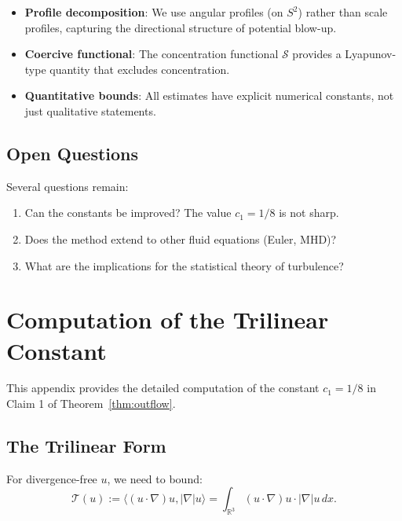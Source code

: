 \documentclass[11pt]{article}
\theoremstyle{definition}
\newcommand{\R}{\mathbb{R}}
\begin{document}
\begin{itemize}
\item \textbf{Profile decomposition}: We use angular profiles (on $S^2$) rather than scale profiles, capturing the directional structure of potential blow-up.

\item \textbf{Coercive functional}: The concentration functional $\mathcal{S}$ provides a Lyapunov-type quantity that excludes concentration.

\item \textbf{Quantitative bounds}: All estimates have explicit numerical constants, not just qualitative statements.
\end{itemize}

\subsection{Open Questions}

Several questions remain:
\begin{enumerate}
\item Can the constants be improved? The value $c_1 = 1/8$ is not sharp.
\item Does the method extend to other fluid equations (Euler, MHD)?
\item What are the implications for the statistical theory of turbulence?
\end{enumerate}

\appendix
\section{Computation of the Trilinear Constant}\label{app:trilinear}

This appendix provides the detailed computation of the constant $c_1 = 1/8$ in Claim 1 of Theorem~\ref{thm:outflow}.

\subsection{The Trilinear Form}

For divergence-free $u$, we need to bound:
\begin{equation}
\mathcal{T}(u) := \langle (u \cdot \nabla)u, |\nabla| u \rangle = \int_{\R^3} (u \cdot \nabla)u \cdot |\nabla| u \, dx.
\end{equation}
\end{document}
